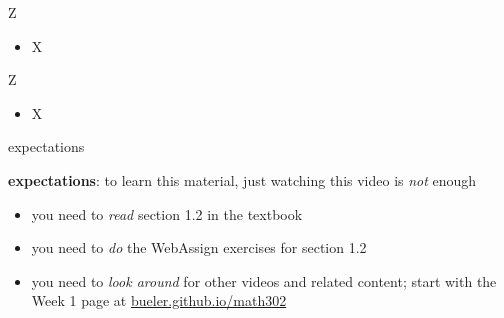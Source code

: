 \documentclass{beamer}
\begin{document}
\begin{frame}{Z}

\begin{itemize}
\item X
\end{itemize}
\end{frame}

\begin{frame}{Z}

\begin{itemize}
\item X
\end{itemize}
\end{frame}



\begin{frame}{expectations}

\textbf{expectations}:  to learn this material, just watching this video is \emph{not} enough
\begin{itemize}
\item you need to \emph{read} section 1.2 in the textbook
\item you need to \emph{do} the WebAssign exercises for section 1.2
\item you need to \emph{look around} for other videos and related content; start with the Week 1 page at \href{https://bueler.github.io/math302/}{bueler.github.io/math302}
\end{itemize}
\end{frame}
\end{document}
